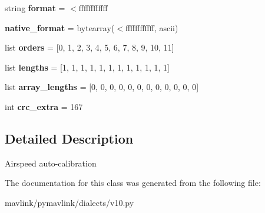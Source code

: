 \begin{DoxyCompactItemize}
\item 
\mbox{\label{classpymavlink_1_1dialects_1_1v10_1_1MAVLink__airspeed__autocal__message_a07ab954b470774f9eeba3e87e5665af0}} 
string {\bfseries format} = \textquotesingle{}$<$ffffffffffff\textquotesingle{}
\item 
\mbox{\label{classpymavlink_1_1dialects_1_1v10_1_1MAVLink__airspeed__autocal__message_abfb2d89d07577c8db8aafb89370a94e4}} 
{\bfseries native\+\_\+format} = bytearray(\textquotesingle{}$<$ffffffffffff\textquotesingle{}, \textquotesingle{}ascii\textquotesingle{})
\item 
\mbox{\label{classpymavlink_1_1dialects_1_1v10_1_1MAVLink__airspeed__autocal__message_ae0e0be6904b064636f789f7301d2a7e2}} 
list {\bfseries orders} = \mbox{[}0, 1, 2, 3, 4, 5, 6, 7, 8, 9, 10, 11\mbox{]}
\item 
\mbox{\label{classpymavlink_1_1dialects_1_1v10_1_1MAVLink__airspeed__autocal__message_ad30f02445e3c70d4abdad3f8cd5360d2}} 
list {\bfseries lengths} = \mbox{[}1, 1, 1, 1, 1, 1, 1, 1, 1, 1, 1, 1\mbox{]}
\item 
\mbox{\label{classpymavlink_1_1dialects_1_1v10_1_1MAVLink__airspeed__autocal__message_a0d5a865d7839ae58b07d021ac54f0821}} 
list {\bfseries array\+\_\+lengths} = \mbox{[}0, 0, 0, 0, 0, 0, 0, 0, 0, 0, 0, 0\mbox{]}
\item 
\mbox{\label{classpymavlink_1_1dialects_1_1v10_1_1MAVLink__airspeed__autocal__message_a5eec0dfdd1f0059d6cf891f07e9284cf}} 
int {\bfseries crc\+\_\+extra} = 167
\end{DoxyCompactItemize}


\subsection{Detailed Description}
\begin{DoxyVerb}Airspeed auto-calibration
\end{DoxyVerb}
 

The documentation for this class was generated from the following file\+:\begin{DoxyCompactItemize}
\item 
mavlink/pymavlink/dialects/v10.\+py\end{DoxyCompactItemize}
